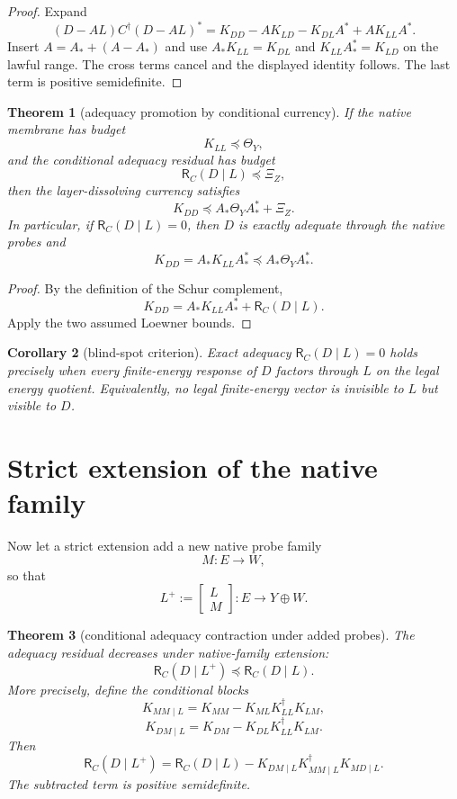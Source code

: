 \documentclass[11pt]{article}
\newtheorem{theorem}{Theorem}[section]
\newtheorem{corollary}[theorem]{Corollary}
\newcommand{\R}{\mathsf R}
\newcommand{\Loewner}{\preceq}
\begin{document}
\begin{proof}
Expand
\[
(D-AL)C^\dagger(D-AL)^*
=K_{DD}-AK_{LD}-K_{DL}A^*+AK_{LL}A^*.
\]
Insert $A=A_*+(A-A_*)$ and use $A_*K_{LL}=K_{DL}$ and $K_{LL}A_*^*=K_{LD}$ on the lawful range.  The cross terms cancel and the displayed identity follows.  The last term is positive semidefinite.
\end{proof}

\begin{theorem}[adequacy promotion by conditional currency]
If the native membrane has budget
\[
        K_{LL}\Loewner \Theta_Y,
\]
and the conditional adequacy residual has budget
\[
        \R_C(D\mid L)\Loewner \Xi_Z,
\]
then the layer-dissolving currency satisfies
\[
        \boxed{
        K_{DD}
        \Loewner
        A_*\Theta_YA_*^*+\Xi_Z.
        }
\]
In particular, if $\R_C(D\mid L)=0$, then $D$ is exactly adequate through the native probes and
\[
        K_{DD}=A_*K_{LL}A_*^*\Loewner A_*\Theta_YA_*^*.
\]
\end{theorem}

\begin{proof}
By the definition of the Schur complement,
\[
K_{DD}=A_*K_{LL}A_*^*+\R_C(D\mid L).
\]
Apply the two assumed Loewner bounds.
\end{proof}

\begin{corollary}[blind-spot criterion]
Exact adequacy $\R_C(D\mid L)=0$ holds precisely when every finite-energy response of $D$ factors through $L$ on the legal energy quotient.  Equivalently, no legal finite-energy vector is invisible to $L$ but visible to $D$.
\end{corollary}

\section{Strict extension of the native family}
Now let a strict extension add a new native probe family
\[
        M:E\to W,
\]
so that
\[
        L^+ := \begin{bmatrix}L\\M\end{bmatrix}:E\to Y\oplus W.
\]

\begin{theorem}[conditional adequacy contraction under added probes]
The adequacy residual decreases under native-family extension:
\[
        \boxed{
        \R_C(D\mid L^+)\Loewner \R_C(D\mid L).
        }
\]
More precisely, define the conditional blocks
\[
K_{MM\mid L}=K_{MM}-K_{ML}K_{LL}^\dagger K_{LM},
\]
\[
K_{DM\mid L}=K_{DM}-K_{DL}K_{LL}^\dagger K_{LM}.
\]
Then
\[
        \boxed{
        \R_C(D\mid L^+)
        =\R_C(D\mid L)
        -K_{DM\mid L}K_{MM\mid L}^\dagger K_{MD\mid L}.
        }
\]
The subtracted term is positive semidefinite.
\end{theorem}
\end{document}
